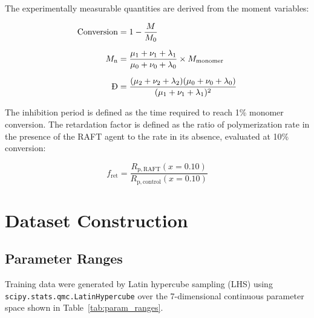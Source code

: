 \documentclass[journal=mamobx,manuscript=suppinfo]{achemso}
\begin{document}
The experimentally measurable quantities are derived from the moment
variables:

\begin{align}
  \text{Conversion} &= 1 - \frac{M}{M_0}
    \label{eq:conversion} \\[6pt]
  M_{\mathrm{n}} &= \frac{\mu_1 + \nu_1 + \lambda_1}
                          {\mu_0 + \nu_0 + \lambda_0}
                    \times M_{\mathrm{monomer}}
    \label{eq:Mn} \\[6pt]
  \text{\DJ} &= \frac{(\mu_2 + \nu_2 + \lambda_2)
                       (\mu_0 + \nu_0 + \lambda_0)}
                      {(\mu_1 + \nu_1 + \lambda_1)^2}
    \label{eq:dispersity}
\end{align}

The inhibition period is defined as the time required to reach 1\%
monomer conversion. The retardation factor is defined as the ratio of
polymerization rate in the presence of the RAFT agent to the rate in its
absence, evaluated at 10\% conversion:

\begin{equation}
  f_{\mathrm{ret}} = \frac{R_{\mathrm{p,RAFT}}(x = 0.10)}
                          {R_{\mathrm{p,control}}(x = 0.10)}
  \label{eq:retardation}
\end{equation}

\section{Dataset Construction}
\label{sec:dataset}

\subsection{Parameter Ranges}

Training data were generated by Latin hypercube sampling (LHS) using
\texttt{scipy.stats.qmc.LatinHypercube} over the 7-dimensional continuous
parameter space shown in Table~\ref{tab:param_ranges}.
\end{document}

